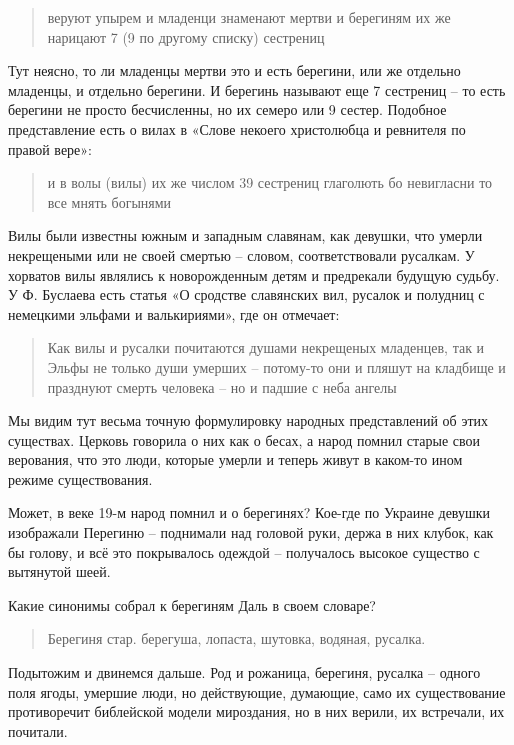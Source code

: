 \documentclass[a5paper,11pt,openany]{article}
\begin{document}
\begin{quotation}
\noindent веруют упырем и младенци знаменают мертви и берегиням их же нарицают 7 (9 по другому списку) сестрениц
\end{quotation}

Тут неясно, то ли младенцы мертви это и есть берегини, или же отдельно младенцы, и отдельно берегини. И берегинь называют еще 7 сестрениц – то есть берегини не просто бесчисленны, но их семеро или 9 сестер. Подобное представление есть о вилах в «Слове некоего христолюбца и ревнителя по правой вере»:

\begin{quotation}
\noindent и в волы (вилы) их же числом 39 сестрениц глаголють бо невигласни то все мнять богынями
\end{quotation}

Вилы были известны южным и западным славянам, как девушки, что умерли некрещеными или не своей смертью – словом, соответствовали русалкам. У хорватов вилы являлись к новорожденным детям и предрекали будущую судьбу. У Ф. Буслаева есть статья «О сродстве славянских вил, русалок и полудниц с немецкими эльфами и валькириями», где он отмечает:

\begin{quotation}
\noindent Как вилы и русалки почитаются душами некрещеных младенцев, так и Эльфы не только души умерших – потому-то они и пляшут на кладбище и празднуют смерть человека – но и падшие с неба ангелы
\end{quotation}

Мы видим тут весьма точную формулировку народных представлений об этих существах. Церковь говорила о них как о бесах, а народ помнил старые свои верования, что это люди, которые умерли и теперь живут в каком-то ином режиме существования.
 
   Может, в веке 19-м народ помнил и о берегинях? Кое-где по Украине девушки изображали Перегиню – поднимали над головой руки, держа в них клубок, как бы голову, и всё это покрывалось одеждой – получалось высокое существо с вытянутой шеей.

Какие синонимы собрал к берегиням Даль в своем словаре?

\begin{quotation}
\noindent Берегиня  стар.  берегуша, лопаста, шутовка, водяная, русалка.
\end{quotation}

    Подытожим и двинемся дальше. Род и рожаница, берегиня, русалка – одного поля ягоды, умершие люди, но действующие, думающие, само их существование противоречит библейской модели мироздания, но в них верили, их встречали, их почитали.
\end{document}
